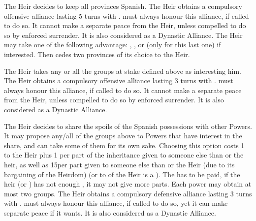 \begin{digressions}
  \bgroup{}


  \aparag The Heir decides to keep all provinces Spanish.
  \aparag The Heir obtains a compulsory offensive alliance lasting 5 turns
  with \SPA. \SPA must always honour this alliance, if called to do so. It
  cannot make a separate peace from the Heir, unless compelled to do so by
  enforced surrender. It is also considered as a Dynastic Alliance.
  \aparag The Heir may take one of the following advantage: , ,  or  (\AUS only for this last one) if
  interested.
  \aparag Then \SPA cedes two provinces of its choice to the Heir.


  \aparag The Heir takes any or all the groups at stake defined above as
  interesting him.
  \aparag The Heir obtains a compulsory offensive alliance lasting 3 turns
  with \SPA. \SPA must always honour this alliance, if called to do so. It
  cannot make a separate peace from the Heir, unless compelled to do so by
  enforced surrender. It is also considered as a Dynastic Alliance.


  \aparag The Heir decides to share the spoils of the Spanish possessions with
  other Powers. It may propose any/all of the groups above to Powers that have
  interest in the share, and can take some of them for its own sake.
  \bparag Choosing this option costs 1 \STAB to the Heir plus 1 \STAB per part
  of the inheritance given to someone else than \HIS or the heir, as well as
  15\VPs per part given to someone else than \HIS or the Heir (due to its
  bargaining of the Heirdom) (or to \SPA of the Heir is a \MIN). The \STAB has
  to be paid, if the heir (or \HIS) has not enough \STAB, it may not give more
  parts.
  \bparag Each power may obtain at most two groups.
  \aparag The Heir obtains a compulsory defensive alliance lasting 3 turns
  with \SPA.  \SPA must always honour this alliance, if called to do so, yet
  it can make separate peace if it wants. It is also considered as a Dynastic
  Alliance.
  \egroup
\end{digressions}

